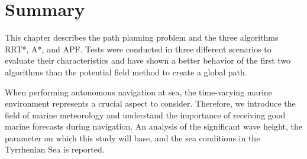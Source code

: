 \section{Summary}
This chapter describes the path planning problem and the three algorithms RRT*, A*, and APF. Tests were conducted in three different scenarios to evaluate their characteristics and have shown a better behavior of the first two algorithms than the potential field method to create a global path.

When performing autonomous navigation at sea, the time-varying marine environment represents a crucial aspect to consider.
Therefore, we introduce the field of marine meteorology and understand the importance of receiving good marine forecasts during navigation.
An analysis of the significant wave height, the parameter on which this study will base, and the sea conditions in the Tyrrhenian Sea is reported.


\vspace{1cm}
\begin{comment}
	Copernicus data provide many other useful products about Mediterranean Sea. Besides the dataset on waves, sea physics is kept under observation and biogeochemistry too. For example, in the figure \ref{chloro} and \ref{zoo} the mass concentrations of Chlorofill and Phytoplankton Biomass in sea water are displayed.
	\begin{figure}[H]
		\centering
		\texttt{[image: Figures/Chlorofill.jpg]}
		\caption{Chlorofill}
		\label{chloro}
	\end{figure} 
	\begin{figure}[H]
		\centering
		\texttt{[image: Figures/Zooplankton.jpg]}
		\caption{Zooplankton}
		\label{zoo}
	\end{figure} 
\end{comment}

